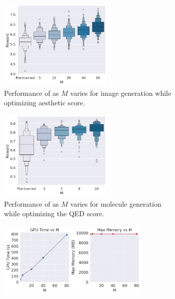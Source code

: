 {\begin{figure}[!tb]
    \centering
\begin{subfigure}[c]{0.48\textwidth}
\centering
    \includegraphics[width=0.60\textwidth]{images/change_K_asthetic.png}
    \caption{Performance of {\alg} as $M$ varies for image generation while optimizing aesthetic score.}
    \label{fig:change_k}
\end{subfigure} 
\begin{subfigure}[c]{0.48\textwidth}
\centering
    \includegraphics[width=0.60\textwidth]{images/change_M_mol_qed.png}
    \caption{Performance of {\alg} as $M$ varies for molecule generation while optimizing the QED score.}
    \label{fig:change_M_mol}
\end{subfigure} 
 \begin{subfigure}[c]{0.48\textwidth}
 \centering
    \includegraphics[width=0.80\textwidth]{images/gpu_memory_time_plot_images.png}

\end{subfigure}
\end{figure}}
